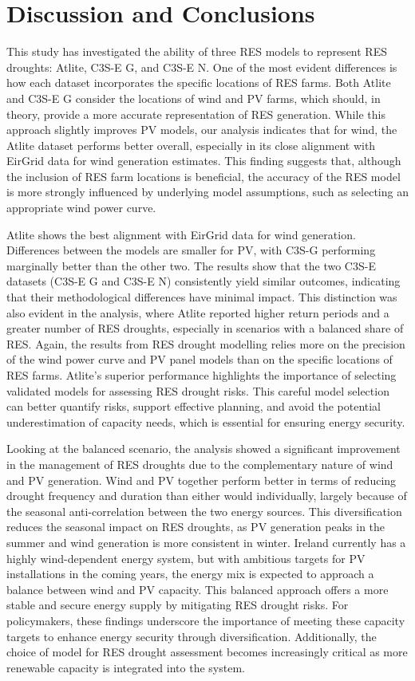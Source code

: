 \documentclass[a4paper, 11pt]{article}
\begin{document}
\newpage
\section{Discussion and Conclusions}
\label{sec:Conclusion}

This study has investigated the ability of three RES models to represent RES droughts: Atlite, C3S-E G, and C3S-E N. One of the most evident differences is how each dataset incorporates the specific locations of RES farms. Both Atlite and C3S-E G consider the locations of wind and PV farms, which should, in theory, provide a more accurate representation of RES generation. While this approach slightly improves PV models, our analysis indicates that for wind, the Atlite dataset performs better overall, especially in its close alignment with EirGrid data for wind generation estimates. This finding suggests that, although the inclusion of RES farm locations is beneficial, the accuracy of the RES model is more strongly influenced by underlying model assumptions, such as selecting an appropriate wind power curve.

Atlite shows the best alignment with EirGrid data for wind generation. Differences between the models are smaller for PV, with C3S-G performing marginally better than the other two. The results show that the two C3S-E datasets (C3S-E G and C3S-E N) consistently yield similar outcomes, indicating that their methodological differences have minimal impact. This distinction was also evident in the analysis, where Atlite reported higher return periods and a greater number of RES droughts, especially in scenarios with a balanced share of RES. Again, the results from RES drought modelling relies more on the precision of the wind power curve and PV panel models than on the specific locations of RES farms. Atlite’s superior performance highlights the importance of selecting validated models for assessing RES drought risks. This careful model selection can better quantify risks, support effective planning, and avoid the potential underestimation of capacity needs, which is essential for ensuring energy security.

Looking at the balanced scenario, the analysis showed a significant improvement in the management of RES droughts due to the complementary nature of wind and PV generation. Wind and PV together perform better in terms of reducing drought frequency and duration than either would individually, largely because of the seasonal anti-correlation between the two energy sources. This diversification reduces the seasonal impact on RES droughts, as PV generation peaks in the summer and wind generation is more consistent in winter. Ireland currently has a highly wind-dependent energy system, but with ambitious targets for PV installations in the coming years, the energy mix is expected to approach a balance between wind and PV capacity. This balanced approach offers a more stable and secure energy supply by mitigating RES drought risks. For policymakers, these findings underscore the importance of meeting these capacity targets to enhance energy security through diversification. Additionally, the choice of model for RES drought assessment becomes increasingly critical as more renewable capacity is integrated into the system.
\end{document}
